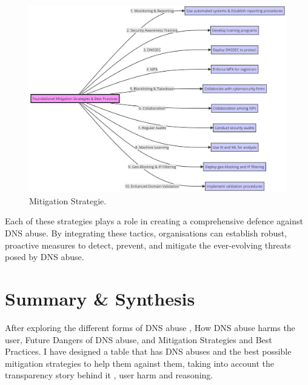 \captionsetup{font= footnotesize}
\begin{figure} [H]
    \centering
   \includegraphics[width=1.1\textwidth]{background/diagram (7).png}
    \caption{Mitigation Strategie.}
    \label{sadasdasdada}
\end{figure}

Each of these strategies plays a role in creating a comprehensive defence against DNS abuse. By integrating these tactics, organisations can establish robust, proactive measures to detect, prevent, and mitigate the ever-evolving threats posed by DNS abuse.

\section{Summary \& Synthesis}

After exploring the different forms of DNS abuse , How DNS abuse harms the user, Future Dangers of DNS abuse, and Mitigation Strategies and Best Practices. I have designed a table that has DNS abuses and the best possible mitigation strategies to help them against them, taking into account the transparency story behind it , user harm and reasoning. 


